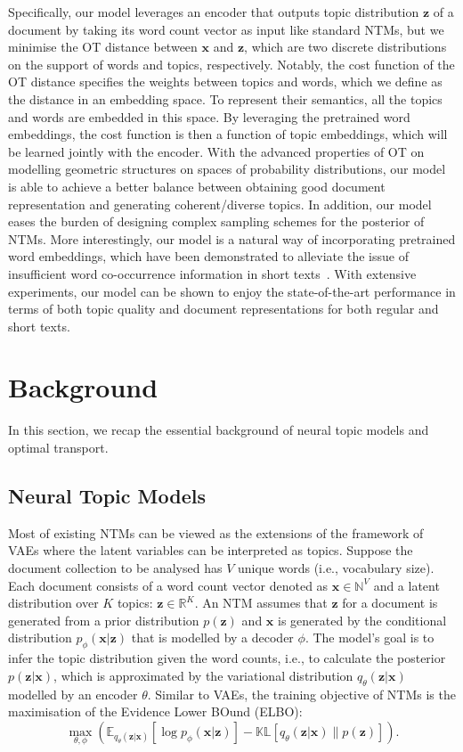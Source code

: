 \documentclass{article}
\renewcommand{\vec}{\boldsymbol}
\newcommand{\exptt}[2]{\mathbb{E}_{#1}\left[#2\right]}
\newcommand{\kl}[2]{\mathbb{KL}\left[{#1}\parallel#2\right]}
\begin{document}
Specifically, our model leverages an encoder that outputs topic distribution $\vec{z}$ of a document by taking its word count vector as input like standard NTMs, but we minimise the OT distance between $\vec{x}$ and $\vec{z}$, which are two discrete distributions on the support of words and topics, respectively. Notably, the cost function of the OT distance specifies the weights between topics and words, which we define as the distance in an embedding space. To represent their semantics, all the topics and words are embedded in this space. By leveraging the pretrained word embeddings, the cost function is then a function of topic embeddings, which will be learned jointly with the encoder. With the advanced properties of OT on modelling geometric structures on spaces of probability distributions, our model is able to achieve a better balance between obtaining good document representation and generating coherent/diverse topics. In addition, our model eases the burden of designing complex sampling schemes for the posterior of NTMs. More interestingly, our model is a natural way of incorporating pretrained word embeddings, which have been demonstrated to alleviate the issue of insufficient word co-occurrence information in short texts~\citep{zhao2017word,dieng2019topic}. With extensive experiments, our model can be shown to enjoy the state-of-the-art performance in terms of both topic quality and document representations for both regular and short texts.





\section{Background}
In this section, we recap the essential background of neural topic models and optimal transport.
\subsection{Neural Topic Models}
\label{sec-ntm}
Most of existing NTMs can be viewed as the extensions of the framework of VAEs where the latent variables can be interpreted as topics.
Suppose the document collection to be analysed has $V$ unique words (i.e., vocabulary size).
Each document consists of a word count vector denoted as $\vec{x} \in \mathbb{N}^V$ and a latent distribution over $K$ topics: $\vec{z} \in \mathbb{R}^K$.
An NTM assumes that $\vec{z}$ for a document is generated from a prior distribution $p(\vec{z})$ and $\vec{x}$ is generated by the conditional distribution $p_{\phi}(\vec{x}|\vec{z})$ that is modelled by a decoder $\phi$.
The model's goal is to infer the topic distribution given the word counts, i.e., to calculate the posterior $p(\vec{z} | \vec{x})$, which is approximated by the variational distribution $q_{\theta}(\vec{z} | \vec{x})$ modelled by an encoder $\theta$. Similar to VAEs, the training objective of NTMs is the maximisation of the Evidence Lower BOund (ELBO):
\begin{equation}
\label{eq-elbo}
\max_{\theta, \phi} \left( \exptt{q_{\theta}(\vec{z} | \vec{x})}{\log p_{\phi}(\vec{x}|\vec{z})} - \kl{q_{\theta}(\vec{z} | \vec{x})}{p(\vec{z})} \right).
\end{equation}
\end{document}
